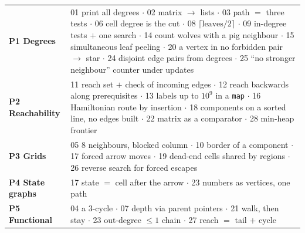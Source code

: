 
\begin{tcolorbox}[enhanced, breakable, colback=white, colframe=accentorange, boxrule=1pt, arc=2mm,
    title={Topic index of the practice set --- one idea per problem}, fonttitle=\bfseries, colbacktitle=accentorange]
\small
\renewcommand{\arraystretch}{1.2}
\begin{tabularx}{\linewidth}{@{}>{\bfseries}l X@{}}
P1 Degrees & 01 print all degrees $\cdot$ 02 matrix $\to$ lists $\cdot$ 03 path $=$ three tests $\cdot$ 06 cell degree is the cut $\cdot$ 08 $\lceil \text{leaves}/2 \rceil$ $\cdot$ 09 in-degree tests $+$ one search $\cdot$ 14 count wolves with a pig neighbour $\cdot$ 15 simultaneous leaf peeling $\cdot$ 20 a vertex in no forbidden pair $\to$ star $\cdot$ 24 disjoint edge pairs from degrees $\cdot$ 25 ``no stronger neighbour'' counter under updates \\
P2 Reachability & 11 reach set $+$ check of incoming edges $\cdot$ 12 reach backwards along prerequisites $\cdot$ 13 labels up to $10^9$ in a \texttt{map} $\cdot$ 16 Hamiltonian route by insertion $\cdot$ 18 components on a sorted line, no edges built $\cdot$ 22 matrix as a comparator $\cdot$ 28 min-heap frontier \\
P3 Grids & 05 8 neighbours, blocked column $\cdot$ 10 border of a component $\cdot$ 17 forced arrow moves $\cdot$ 19 dead-end cells shared by regions $\cdot$ 26 reverse search for forced escapes \\
P4 State graphs & 17 state $=$ cell after the arrow $\cdot$ 23 numbers as vertices, one path \\
P5 Functional & 04 a 3-cycle $\cdot$ 07 depth via parent pointers $\cdot$ 21 walk, then stay $\cdot$ 23 out-degree $\le 1$ chain $\cdot$ 27 reach $=$ tail $+$ cycle \\
\end{tabularx}
\end{tcolorbox}
